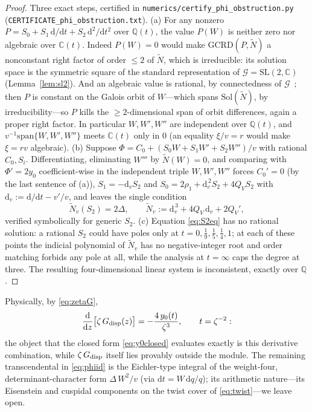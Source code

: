 \documentclass[cntp]{ipart}
\newcommand{\rmd}{\mathrm{d}}
\theoremstyle{plain}
\theoremstyle{remark}
\begin{document}
\begin{proof}
Three exact steps, certified in
\texttt{numerics/\allowbreak certify\_\allowbreak phi\_\allowbreak obstruction.py}
(\texttt{CERTIFICATE\_\allowbreak phi\_\allowbreak obstruction.txt}). (a) For any nonzero $P=S_0+S_1\,\rmd/\rmd t+S_2\,
\rmd^2/\rmd t^2$ over $\mathbb{Q}(t)$, the value $P(W)$ is neither zero nor algebraic over
$\mathbb{C}(t)$. Indeed $P(W)=0$ would make $\mathrm{GCRD}(P,\widetilde N)$ a nonconstant right
factor of order ${\le}2$ of $\widetilde N$, which is irreducible: its solution space is the
symmetric square of the standard representation of $\mathcal{G}=\mathrm{SL}(2,\mathbb{C})$
(Lemma~\ref{lem:sl2}). And an algebraic value is rational, by connectedness of
$\mathcal{G}$~\cite{vdPutSinger}; then $P$ is constant on the Galois orbit of $W$---which spans
$\mathrm{Sol}(\widetilde N)$, by irreducibility---so $P$ kills the ${\ge}2$-dimensional span of
orbit differences, again a proper right factor. In particular $W,W',W''$ are independent over
$\mathbb{Q}(t)$, and $v^{-1}\mathrm{span}\{W,W',W''\}$ meets $\mathbb{C}(t)$ only in $0$ (an
equality $\xi/v=r$ would make $\xi=rv$ algebraic). (b) Suppose
$\Phi=C_0+(S_0W+S_1W'+S_2W'')/v$ with rational $C_0,S_i$. Differentiating, eliminating $W'''$ by
$\widetilde N(W)=0$, and comparing with $\Phi'=2y_0$ coefficient-wise in the independent triple
$W,W',W''$ forces $C_0'=0$ (by the last sentence of (a)), $S_1=-\rmd_vS_2$ and
$S_0=2\rho_1+\rmd_v^{\,2}S_2+4Q_VS_2$ with $\rmd_v:=\rmd/\rmd t-v'/v$, and leaves the single
condition
\begin{equation}
\widetilde N_v(S_2)=2\Delta,\qquad
\widetilde N_v:=\rmd_v^{\,3}+4Q_V\,\rmd_v+2Q_V',
\label{eq:S2eq}
\end{equation}
verified symbolically for generic $S_2$. (c) Equation \eqref{eq:S2eq} has no rational solution: a
rational $S_2$ could have poles only at $t=0,\tfrac19,\tfrac15,\tfrac14,1$; at each of these points
the indicial polynomial of $\widetilde N_v$ has no negative-integer root and order matching forbids
any pole at all, while the analysis at $t=\infty$ caps the degree at three. The resulting
four-dimensional linear system is inconsistent, exactly over $\mathbb{Q}$.
\end{proof}

Physically, by \eqref{eq:zetaG},
\begin{equation}
\frac{\rmd}{\rmd z}\big[\zeta\,G_{\rm disp}(z)\big]=-\frac{4\,y_0(t)}{\zeta^{3}},\qquad
t=\zeta^{-2}:
\label{eq:dzG}
\end{equation}
the object that the closed form \eqref{eq:y0closed} evaluates exactly is this derivative combination,
while $\zeta\,G_{\rm disp}$ itself lies provably outside the module. The remaining transcendental
in \eqref{eq:phiid} is the Eichler-type integral of the weight-four, determinant-character form
$\Delta\,W^2/v$ (via $\rmd t=W\,\rmd q/q$); its arithmetic nature---its Eisenstein and cuspidal
components on the twist cover of \eqref{eq:twist}---we leave open.
\end{document}
